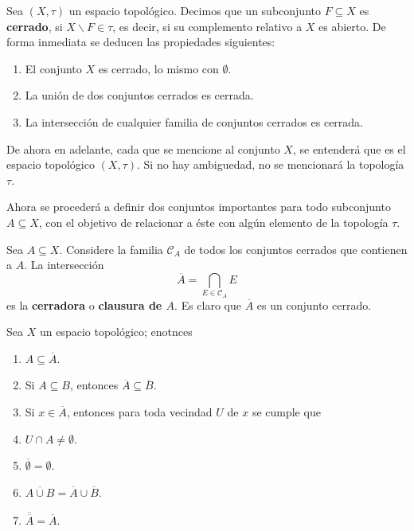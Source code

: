 \documentclass[12pt]{report}
\theoremstyle{largebreak}
\renewcommand{\theenumi}{\arabic{enumi})}
\begin{document}
    \begin{mydef}
        Sea $(X,\tau)$ un espacio topológico. Decimos que un subconjunto $F\subseteq X$ es \textbf{cerrado}, si $X\backslash F\in \tau$, es decir, si su complemento relativo a $X$ es abierto. De forma inmediata se deducen las propiedades siguientes:
        \renewcommand{\theenumi}{C\arabic{enumi})}
        \begin{enumerate}
            \item El conjunto $X$ es cerrado, lo mismo con $\emptyset$.
            \item La unión de dos conjuntos cerrados es cerrada.
            \item La intersección de cualquier familia de conjuntos cerrados es cerrada.
        \end{enumerate}
        \renewcommand{\theenumi}{B\arabic{enumi})}
    \end{mydef}

    De ahora en adelante, cada que se mencione al conjunto $X$, se entenderá que es el espacio topológico $(X,\tau)$. Si no hay ambiguedad, no se mencionará la topología $\tau$.

    Ahora se procederá a definir dos conjuntos importantes para todo subconjunto $A\subseteq X$, con el objetivo de relacionar a éste con algún elemento de la topología $\tau$.

    \begin{mydef}
        Sea $A\subseteq X$. Considere la familia $\mathcal{C}_A$ de todos los conjuntos cerrados que contienen a $A$. La intersección
        \begin{equation*}
            \overline{A}=\bigcap_{E\in\mathcal{C}_A}E
        \end{equation*}
        es la \textbf{cerradora} o \textbf{clausura de $A$}. Es claro que $\overline{A}$ es un conjunto cerrado.
    \end{mydef}

    \begin{propo}
        Sea $X$ un espacio topológico; enotnces
        \renewcommand{\theenumi}{\arabic{enumi})}
        \begin{enumerate}
            \item $A\subseteq \overline{A}$.
            \item Si $A\subseteq B$, entonces $\overline{A}\subseteq\overline{B}$.
            \item Si $x\in\overline{A}$, entonces para toda vecindad $U$ de $x$ se cumple que
            \item $U\cap A\neq\emptyset$.
            \item $\overline{\emptyset}=\emptyset$.
            \item $\overline{A\cup B}=\overline{A}\cup\overline{B}$.
            \item $\overline{\overline{A}}=\overline{A}$.
        \end{enumerate}
    \end{propo}
\end{document}
